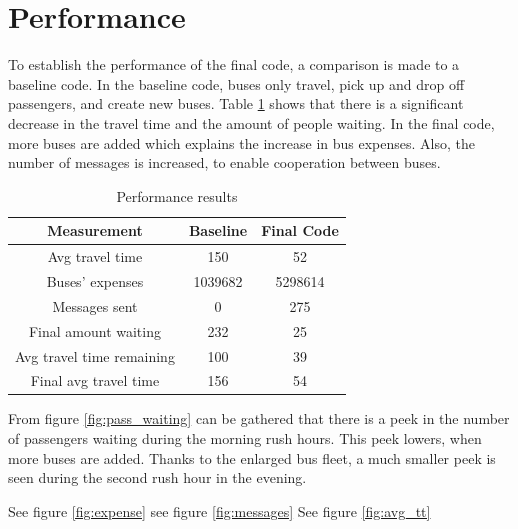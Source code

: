 \section{Performance}

To establish the performance of the final code, a comparison is made to a baseline code. In the baseline code, buses only travel, pick up and drop off passengers, and create new buses. Table \ref{table:table1} shows that there is a significant decrease in the travel time and the amount of people waiting. In the final code, more buses are added which explains the increase in bus expenses. Also, the number of messages is increased, to enable cooperation between buses. 

\begin{table}[htbp]
\centering
\begin{tabular}{ |c|c|c|  }
 \hline
  Measurement & Baseline & Final Code \\
 \hline
  Avg travel time & 150 & 52 \\
  Buses' expenses & 1039682 & 5298614 \\
  Messages sent & 0 & 275  \\
  Final amount waiting & 232 & 25 \\
  Avg travel time remaining & 100 & 39 \\
  Final avg travel time & 156 & 54 \\
 \hline
\end{tabular}
\label{table:table1}
\caption{Performance results}
\end{table}


From figure \ref{fig:pass_waiting} can be gathered that there is a peek in the number of passengers waiting during the morning rush hours. This peek lowers, when more buses are added. Thanks to the enlarged bus fleet, a much smaller peek is seen during the second rush hour in the evening.

See figure \ref{fig:expense}
see figure \ref{fig:messages}
See figure \ref{fig:avg_tt}

